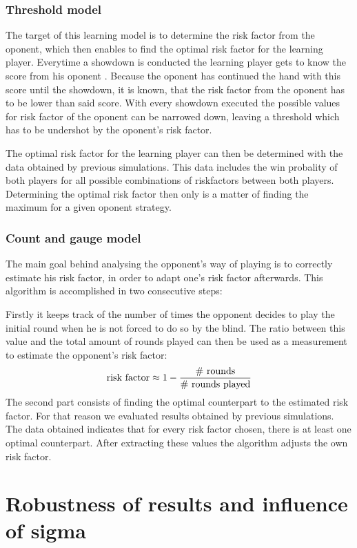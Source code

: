 \documentclass[11pt]{article}
\begin{document}
\subsubsection{Threshold model}

The target of this learning model is to determine the risk factor from the oponent, which then enables to find the optimal risk factor for the learning player.
Everytime a showdown is conducted the learning player gets to know the score from his oponent . Because the oponent has continued the hand with this score until the showdown, it is known, that the risk factor from the oponent has to be lower than said score. With every showdown executed the possible values for risk factor of the oponent can be narrowed down, leaving a threshold which has to be undershot by the oponent's risk factor.


The optimal risk factor for the learning player can then be determined with the data obtained by previous simulations. This data includes the win probality of both players for all possible combinations of riskfactors between both players. Determining the optimal risk factor then only is a matter of finding the maximum for a given oponent strategy.

\subsubsection{Count and gauge model}

The main goal behind analysing the opponent’s way of playing is to correctly estimate his risk factor, in order to adapt one’s risk factor afterwards. 
This algorithm is accomplished in two consecutive steps:
 
Firstly it keeps track of the number of times the opponent decides to play the initial round when he is not forced to do so by the blind. The ratio between this value and the total amount of rounds played can then be used as a measurement to estimate the opponent’s risk factor:
 $$
\textnormal{risk factor} \approx 1 - \dfrac{\textnormal{\# rounds}}{\textnormal{\# rounds played}}
 $$
The second part consists of finding the optimal counterpart to the estimated risk factor. For that reason we evaluated results obtained by previous simulations. The data obtained indicates that for every risk factor chosen, there is at least one optimal counterpart. After extracting these values the algorithm adjusts the own risk factor.

 

\section{Robustness of results and influence of sigma}
\end{document}
